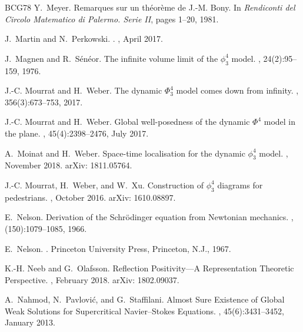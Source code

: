 \documentclass[a4paper,11pt]{article}
\numberwithin{equation}{section}
\begin{document}
\begin{thebibliography}{BCG{\etalchar{+}}78}
Y.~Meyer.
\newblock Remarques sur un th\'eor\`eme de {J}.-{M}. {Bony}.
\newblock In {\em Rendiconti del {Circolo} {Matematico} di {Palermo}. {Serie}
  {II}}, pages 1--20, 1981.

J.~{Martin} and N.~{Perkowski}.
.
, April 2017.

J.~Magnen and R.~S\'en\'eor.
\newblock The infinite volume limit of the $\phi^4_3$ model.
, 24(2):95--159, 1976.

J.-C. Mourrat and H.~Weber.
\newblock The dynamic {$\Phi^4_3$} model comes down from infinity.
, 356(3):673--753, 2017.

J.-C. Mourrat and H.~Weber.
\newblock Global well-posedness of the dynamic {$\Phi^4$} model in the plane.
, 45(4):2398--2476, July 2017.

A.~Moinat and H.~Weber.
\newblock Space-time localisation for the dynamic $\phi^4_3$ model.
, November 2018.
\newblock arXiv: 1811.05764.

J.-C. Mourrat, H.~Weber, and W.~Xu.
\newblock Construction of $\phi^4_3$ diagrams for pedestrians.
, October 2016.
\newblock arXiv: 1610.08897.

E.~Nelson.
\newblock Derivation of the {S}chr\"odinger equation from {N}ewtonian
  mechanics.
, (150):1079--1085, 1966.

E.~Nelson.
.
\newblock Princeton University Press, Princeton, N.J., 1967.

K.-H. Neeb and G.~Olafsson.
\newblock Reflection {Positivity}---{A} {Representation} {Theoretic}
  {Perspective}.
, February 2018.
\newblock arXiv: 1802.09037.

A.~Nahmod, N.~Pavlovi{\'c}, and G.~Staffilani.
\newblock Almost {Sure} {Existence} of {Global} {Weak} {Solutions} for
  {Supercritical} {Navier}--{Stokes} {Equations}.
, 45(6):3431--3452,
  January 2013.


\end{thebibliography}
\end{document}
